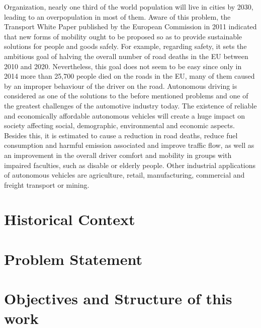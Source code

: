 Organization, nearly one third of the world population will live in cities by 2030, leading to
an overpopulation in most of them. Aware of this problem, the Transport White Paper published by the European Commission in 2011 indicated that new forms of mobility ought
to be proposed so as to provide sustainable solutions for people and goods safely. For
example, regarding safety, it sets the ambitious goal of halving the overall number of road
deaths in the EU between 2010 and 2020. Nevertheless, this goal does not seem to be easy
since only in 2014 more than 25,700 people died on the roads in the EU, many of them
caused by an improper behaviour of the driver on the road.
Autonomous driving is considered as one of the solutions to the before mentioned problems
and one of the greatest challenges of the automotive industry today. The existence of
reliable and economically affordable autonomous vehicles will create a huge impact on
society affecting social, demographic, environmental and economic aspects. Besides this, it
is estimated to cause a reduction in road deaths, reduce fuel consumption and harmful
emission associated and improve traffic flow, as well as an improvement in the overall
driver comfort and mobility in groups with impaired faculties, such as disable or elderly
people. Other industrial applications of autonomous vehicles are agriculture, retail,
manufacturing, commercial and freight transport or mining.

\section{Historical Context}
\label{sec:1_historical_context}

\section{Problem Statement}
\label{sec:1_problem_statement}

\cite{huang2022survey}

\section{Objectives and Structure of this work}
\label{sec:1_objectives_and_structure}

